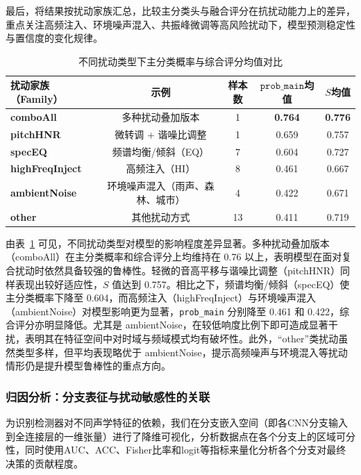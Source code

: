 \documentclass[a4paper,12pt]{article}
\begin{document}
最后，将结果按扰动家族汇总，比较主分类头与融合评分在抗扰动能力上的差异，重点关注高频注入、环境噪声混入、共振峰微调等高风险扰动下，模型预测稳定性与置信度的变化规律。

\begin{table}[H]
\centering
\caption{不同扰动类型下主分类概率与综合评分均值对比}
\label{tab:family-stats}
\begin{tabular}{lcccc}
\toprule
扰动家族（Family） & 示例 & 样本数 & $\texttt{prob\_main}$均值 & $S$均值 \\
\midrule
\textbf{comboAll}       & 多种扰动叠加版本                 & 1  & \textbf{0.764} & \textbf{0.776} \\
\textbf{pitchHNR}       & 微转调 + 谐噪比调整              & 1  & 0.659          & 0.757 \\
\textbf{specEQ}         & 频谱均衡/倾斜（EQ）              & 7  & 0.604          & 0.727 \\
\textbf{highFreqInject} & 高频注入（HI）                   & 8  & 0.461          & 0.667 \\
\textbf{ambientNoise}   & 环境噪声混入（雨声、森林、城市） & 4  & 0.422          & 0.671 \\
\textbf{other}          & 其他扰动方式                     & 13 & 0.411          & 0.719 \\
\bottomrule
\end{tabular}
\end{table}

由表~\ref{tab:family-stats} 可见，不同扰动类型对模型的影响程度差异显著。多种扰动叠加版本（comboAll）在主分类概率和综合评分上均维持在 0.76 以上，表明模型在面对复合扰动时依然具备较强的鲁棒性。轻微的音高平移与谐噪比调整（pitchHNR）同样表现出较好适应性，$S$ 值达到 0.757。相比之下，频谱均衡/倾斜（specEQ）使主分类概率下降至 0.604，而高频注入（highFreqInject）与环境噪声混入（ambientNoise）对模型影响更为显著，\texttt{prob\_main} 分别降至 0.461 和 0.422，综合评分亦明显降低。尤其是 ambientNoise，在较低响度比例下即可造成显著干扰，表明其在特征空间中对时域与频域模式均有破坏性。此外，“other”类扰动虽然类型多样，但平均表现略优于 ambientNoise，提示高频噪声与环境混入等扰动情形仍是提升模型鲁棒性的重点方向。






\subsubsection{归因分析：分支表征与扰动敏感性的关联}
为识别检测器对不同声学特征的依赖，我们在分支嵌入空间（即各CNN分支输入到全连接层的一维张量）进行了降维可视化，分析数据点在各个分支上的区域可分性，同时使用AUC、ACC、Fisher比率和logit等指标来量化分析各个分支对最终决策的贡献程度。
\end{document}
